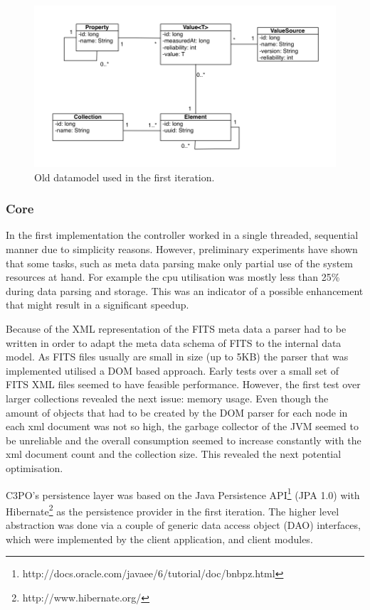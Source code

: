 \begin{figure}[t]
\begin{center}
\includegraphics[width=5in]{figures/architecture/old_datamodel.png}
\caption{Old datamodel used in the first iteration.}
\label{fig:old_datamodel}
\end{center}
\end{figure}

\subsubsection{Core}
In the first implementation the controller worked in a single threaded, sequential manner due to simplicity reasons. However, preliminary experiments have shown that some tasks, such as meta data parsing make only partial use of the system resources at hand. For example the cpu utilisation was mostly less than 25\% during data parsing and storage. This was an indicator of a possible enhancement that might result in a significant speedup.

Because of the XML representation of the FITS meta data a parser had to be written in order to adapt the meta data schema of FITS to the internal data model. As FITS files usually are small in size (up to 5KB) the parser that was implemented utilised a DOM based approach. Early tests over a small set of FITS XML files seemed to have feasible performance. However, the first test over larger collections revealed the next issue: memory usage. Even though the amount of objects that had to be created by the DOM parser for each node in each xml document was not so high, the garbage collector of the JVM seemed to be unreliable and the overall consumption seemed to increase constantly with the xml document count and the collection size. This revealed the next potential optimisation.

C3PO's persistence layer was based on the Java Persistence API\footnote{http://docs.oracle.com/javaee/6/tutorial/doc/bnbpz.html} (JPA 1.0) with Hibernate\footnote{http://www.hibernate.org/} as the persistence provider in the first iteration. The higher level abstraction was done via a couple of generic data access object (DAO) interfaces, which were implemented by the client application, and client modules.

